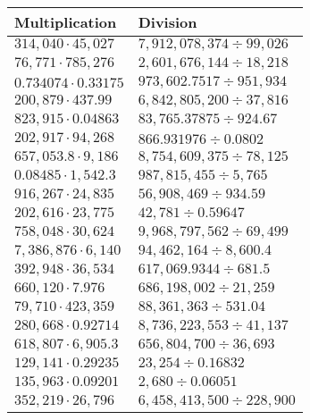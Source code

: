 \begin{longtable}[]{@{}ll@{}}
\toprule
Multiplication & Division\tabularnewline
\midrule
\endhead
\(314,040\cdot45,027\) & \(7,912,078,374÷99,026\)\tabularnewline
\(76,771\cdot785,276\) & \(2,601,676,144÷18,218\)\tabularnewline
\(0.734074\cdot0.33175\) & \(973,602.7517÷951,934\)\tabularnewline
\(200,879\cdot437.99\) & \(6,842,805,200÷37,816\)\tabularnewline
\(823,915\cdot0.04863\) & \(83,765.37875÷924.67\)\tabularnewline
\(202,917\cdot94,268\) & \(866.931976÷0.0802\)\tabularnewline
\(657,053.8\cdot9,186\) & \(8,754,609,375÷78,125\)\tabularnewline
\(0.08485\cdot1,542.3\) & \(987,815,455÷5,765\)\tabularnewline
\(916,267\cdot24,835\) & \(56,908,469÷934.59\)\tabularnewline
\(202,616\cdot23,775\) & \(42,781÷0.59647\)\tabularnewline
\(758,048\cdot30,624\) & \(9,968,797,562÷69,499\)\tabularnewline
\(7,386,876\cdot6,140\) & \(94,462,164÷8,600.4\)\tabularnewline
\(392,948\cdot36,534\) & \(617,069.9344÷681.5\)\tabularnewline
\(660,120\cdot7.976\) & \(686,198,002÷21,259\)\tabularnewline
\(79,710\cdot423,359\) & \(88,361,363÷531.04\)\tabularnewline
\(280,668\cdot0.92714\) & \(8,736,223,553÷41,137\)\tabularnewline
\(618,807\cdot6,905.3\) & \(656,804,700÷36,693\)\tabularnewline
\(129,141\cdot0.29235\) & \(23,254÷0.16832\)\tabularnewline
\(135,963\cdot0.09201\) & \(2,680÷0.06051\)\tabularnewline
\(352,219\cdot26,796\) & \(6,458,413,500÷228,900\)\tabularnewline
\bottomrule
\end{longtable}
